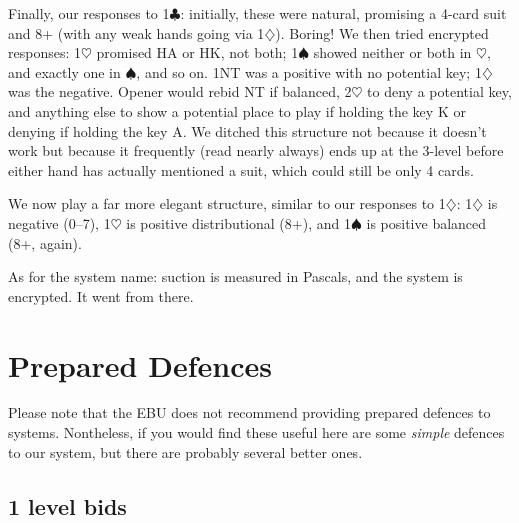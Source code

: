 \documentclass[a4paper,14pt]{extarticle}
\begin{document}
Finally, our responses to 1$\clubsuit$: initially, these were natural, promising a 4-card
suit and 8+ (with any weak hands going via 1$\diamondsuit$).  Boring!  We then tried
encrypted responses: 1$\heartsuit$ promised HA or HK, not both; 1$\spadesuit$ showed neither or both
in $\heartsuit$, and exactly one in $\spadesuit$, and so on.  1NT was a positive with no potential
key; 1$\diamondsuit$ was the negative.  Opener would rebid NT if balanced, 2$\heartsuit$ to deny a
potential key, and anything else to show a potential place to play if holding
the key K or denying if holding the key A.  We ditched this structure not
because it doesn't work but because it frequently (read nearly always) ends up
at the 3-level before either hand has actually mentioned a suit, which could
still be only 4 cards.

We now play a far more elegant structure, similar to our responses to 1$\diamondsuit$: 1$\diamondsuit$ is
negative (0--7), 1$\heartsuit$ is positive distributional (8+), and 1$\spadesuit$ is positive balanced
(8+, again).

As for the system name: suction is measured in Pascals, and the system is
encrypted.  It went from there.

\newpage

\def\thesection{\Alph{section}}
\setcounter{section}{0}

\section{Prepared Defences}
\label{appx:defences}

Please note that the EBU does not recommend providing prepared defences to
systems.  Nontheless, if you would find these useful here are some {\em simple}
defences to our system, but there are probably several better ones.

\subsection{1 level bids}
\end{document}
